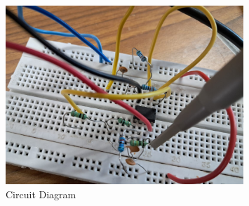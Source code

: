 \documentclass[a4paper,12pt]{article}
\begin{document}
\begin{figure}[H]
    \centering
    \includegraphics[width=0.8\textwidth]{fig/bp.jpeg}
    \caption{Circuit Diagram}
    \label{fig:your-label}
\end{figure}
\end{document}
